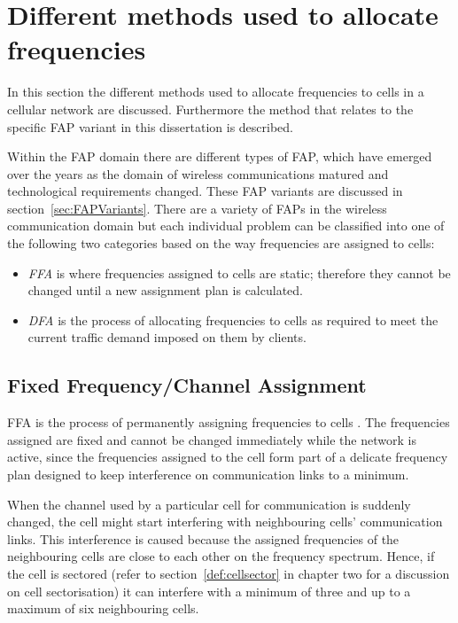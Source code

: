 \section[Frequency Allocation Types]{Different methods used to allocate frequencies}
\label{sec:FreqAssignmentTypes}
In this section the different methods used to allocate frequencies to cells in a cellular network are discussed. Furthermore the method that relates to the specific \gls{FAP} variant in this dissertation is described.

Within the \gls{FAP} domain there are different types of \gls{FAP}, which have emerged over the years as the domain of wireless communications matured and technological requirements changed. These \gls{FAP} variants are discussed in section~\ref{sec:FAPVariants}.
There are a variety of \gls{FAP}s in the wireless communication domain but each individual problem can be classified into one of the following two categories based on the way frequencies are assigned to cells:
\begin{itemize}
  \item \emph{\Gls{FFA}} is where frequencies assigned to cells are static; therefore they cannot be changed until a new assignment plan is calculated\cite{PrinciplesMobileCommunication}.
\item \emph{\Gls{DFA}} is the process of allocating frequencies to cells as required to meet the current traffic demand imposed on them by clients\cite{PrinciplesMobileCommunication}. 
\end{itemize}

\subsection{Fixed Frequency/Channel Assignment}
\gls{FFA} is the process of permanently assigning frequencies to cells \cite{PrinciplesMobileCommunication}. The frequencies assigned are fixed and cannot be changed immediately while the network is active, since the frequencies assigned to the cell form part of a delicate frequency plan designed to keep interference on communication links to a minimum\cite{PrinciplesMobileCommunication}. 

When the channel used by a particular cell for communication is suddenly changed, the cell might start interfering with neighbouring cells' communication links. This interference is caused because the assigned frequencies of the neighbouring cells are close to each other on the frequency spectrum. Hence, if the cell is sectored (refer to section~\ref{def:cellsector} in chapter two for a discussion on cell sectorisation) it can interfere with a minimum of three and up to a maximum of six neighbouring cells\cite{PrinciplesMobileCommunication}.

